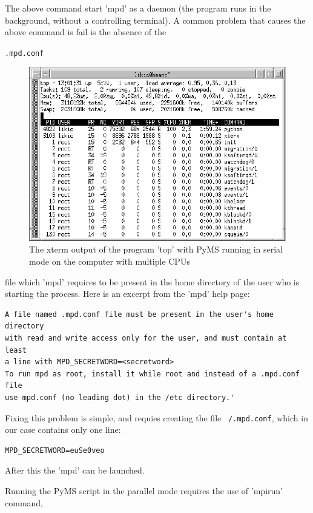 The above command start 'mpd' as a daemon (the program runs in the
background, without a controlling terminal).  A common problem
that causes the above command is fail is the absence of the
{\tt .mpd.conf
\begin{figure}
  \begin{center}
    \includegraphics[scale=1.0]{graphics/chapter09/top-serial.eps}
  \end{center}
  \caption{The xterm output of the program 'top' with PyMS running in
  serial mode on the computer with multiple CPUs}
  \label{fig:top-serial}
\end{figure}
} file which 'mpd' requires to be present in the
home directory of the user who is starting the process. Here is
an excerpt from the 'mpd' help page:

\begin{verbatim}
A file named .mpd.conf file must be present in the user's home directory
with read and write access only for the user, and must contain at least
a line with MPD_SECRETWORD=<secretword>
To run mpd as root, install it while root and instead of a .mpd.conf file
use mpd.conf (no leading dot) in the /etc directory.' 
\end{verbatim}

Fixing this problem is simple, and requies creating the file
{\tt ~/.mpd.conf}, which in our case contains only one line:

\begin{verbatim}
MPD_SECRETWORD=euSe0veo
\end{verbatim}

After this the 'mpd' can be launched.

Running the PyMS script in the parallel mode requires the use of 'mpirun'
command,

